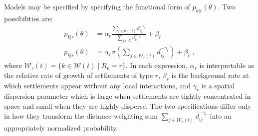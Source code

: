 \documentclass[english]{scrartcl}
\begin{document}
	Models may be specified by specifying the functional form of $p_{k|r}(\theta)$. 
	Two possibilities are: 
	\begin{align}
		p_{k|r}(\theta) &= \alpha_r \frac{\sum_{j \in \mathcal{W}_r(t)} d_{ij}^{-\gamma_r}}{\sum_{j \in G} d_{ij}^{-\gamma_u}} + \beta_r \label{eq:original}\\ 
		 p_{k|r}(\theta) &= \alpha_r \sigma \left(\sum_{j \in \mathcal{W}_r(t)} d_{ij}^{-\gamma_r}\right) + \beta_r \label{eq:model_1}\;,
	\end{align}
	where $\mathcal{W}_r(t) = \{ k \in \mathcal{W}(t) \;|\; R_k = r \}$. 
	In each expression, $\alpha_r$ is interpretable as the relative rate of growth of settlements of type $r$, $\beta_r$ is the background rate at which settlements appear without any local interactions, and $\gamma_r$ is a spatial dispersion parameter which is large when settlements are tightly concentrated in space and small when they are highly disperse. 
	The two specifications differ only in how they transform the distance-weighting sum $\sum_{j \in \mathcal{W}_r(t)} d_{ij}^{-\gamma_r}$ into an appropriately normalized probability.
\end{document}
